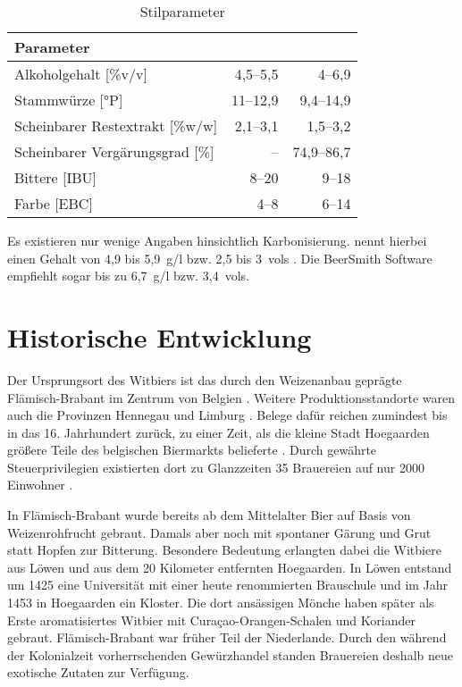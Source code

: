 \documentclass[a4paper,parskip=half]{scrartcl}
\begin{document}
\begin{table}[H]
\centering
\begin{tabular}{lrr}
\toprule
Parameter                    & \citeauthor{BJCP2015} & \citeauthor{Strottner1999} \\
\midrule
Alkoholgehalt [\%v/v]        & 4,5–5,5 & 4–6,9 \\
Stammwürze [°P]              & 11–12,9 & 9,4–14,9 \\
Scheinbarer Restextrakt [\%w/w] & 2,1–3,1 & 1,5–3,2 \\
Scheinbarer Vergärungsgrad [\%] & –       & 74,9–86,7 \\
Bittere [IBU]                & 8–20    & 9–18 \\
Farbe [EBC]                  & 4–8     & 6–14 \\
\bottomrule
\end{tabular}
\caption{Stilparameter \parencites[49]{BJCP2015}{Strottner1999}}
\label{table:parameters}
\end{table}

Es existieren nur wenige Angaben hinsichtlich Karbonisierung.
\citeauthor{Zainasheff2007} nennt hierbei einen  Gehalt von
4,9 bis 5,9~g/l bzw. 2,5 bis 3~vols \parencite{Zainasheff2007}.
Die BeerSmith Software empfiehlt sogar bis zu 6,7~g/l bzw. 3,4~vols.

\section*{Historische Entwicklung}

Der Ursprungsort des Witbiers ist das durch den Weizenanbau geprägte
Flämisch-Brabant im Zentrum von Belgien \parencite[44]{Roncoroni2018}.
Weitere Produktionsstandorte waren auch die Provinzen Hennegau und
Limburg \parencite[118]{Strottner1999}.
Belege dafür reichen zumindest bis in das 16. Jahrhundert
zurück, zu einer Zeit, als die kleine Stadt Hoegaarden größere
Teile des belgischen Biermarkts belieferte \parencite[46]{Mulder2020}. 
Durch gewährte Steuerprivilegien existierten dort zu Glanzzeiten 35
Brauereien auf nur 2000 Einwohner \parencite[27]{Sparrow2002}.

In Flämisch-Brabant wurde bereits ab dem Mittelalter Bier auf
Basis von Weizenrohfrucht gebraut. Damals aber noch mit
spontaner Gärung und Grut statt Hopfen zur Bitterung.
Besondere Bedeutung erlangten dabei die Witbiere aus Löwen
und aus dem 20 Kilometer entfernten Hoegaarden. In Löwen
entstand um 1425 eine Universität mit einer heute renommierten Brauschule
und im Jahr 1453 in Hoegaarden ein Kloster. Die dort ansässigen
Mönche haben später als Erste aromatisiertes Witbier mit
Curaçao-Orangen-Schalen und Koriander gebraut. Flämisch-Brabant war
früher Teil der Niederlande. Durch den während der
Kolonialzeit vorherrschenden Gewürzhandel standen
Brauereien deshalb neue exotische Zutaten zur Verfügung.
\parencite[1,4]{Strottner1999}
\end{document}

